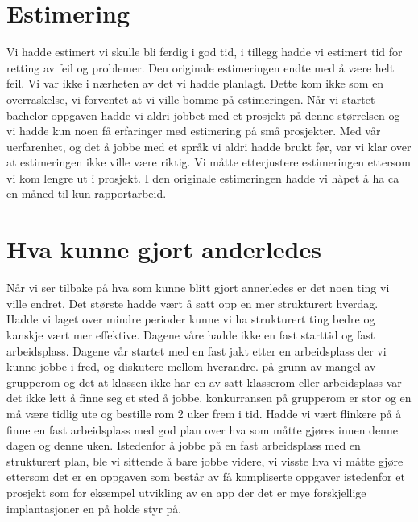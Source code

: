 \section{Estimering}
Vi hadde estimert vi skulle bli ferdig i god tid, i tillegg hadde vi estimert tid for retting av feil og problemer. Den originale estimeringen endte med å være helt feil. Vi var ikke i nærheten av det vi hadde planlagt. Dette kom ikke som en overraskelse, vi forventet at vi ville bomme på estimeringen. Når vi startet bachelor oppgaven hadde vi aldri jobbet med et prosjekt på denne størrelsen og vi hadde kun noen få erfaringer med estimering på små prosjekter. Med vår uerfarenhet, og det å jobbe med et språk vi aldri hadde brukt før, var vi klar over at estimeringen ikke ville være riktig. Vi måtte etterjustere estimeringen ettersom vi kom lengre ut i prosjekt. I den originale estimeringen hadde vi håpet å ha ca en måned til kun rapportarbeid.

\section{Hva kunne gjort anderledes}
Når vi ser tilbake på hva som kunne blitt gjort annerledes er det noen ting vi ville endret. Det største hadde vært å satt opp en mer strukturert hverdag. Hadde vi laget over mindre perioder kunne vi ha strukturert ting bedre og kanskje vært mer effektive. Dagene våre hadde ikke en fast starttid og fast arbeidsplass. Dagene vår startet med en fast jakt etter en arbeidsplass der vi kunne jobbe i fred, og diskutere mellom hverandre. på grunn av mangel av grupperom og det at klassen ikke har en av satt klasserom eller arbeidsplass var det ikke lett å finne seg et sted å jobbe. konkurransen på grupperom er stor og en må være tidlig ute og bestille rom 2 uker frem i tid. Hadde vi vært flinkere på å finne en fast arbeidsplass med god plan over hva som måtte gjøres innen denne dagen og denne uken. Istedenfor å jobbe på en fast arbeidsplass med en strukturert plan, ble vi sittende å bare jobbe videre, vi visste hva vi måtte gjøre ettersom det er en oppgaven som består av få kompliserte oppgaver istedenfor et prosjekt som for eksempel utvikling av en app der det er mye forskjellige implantasjoner en på holde styr på.\\ \\

